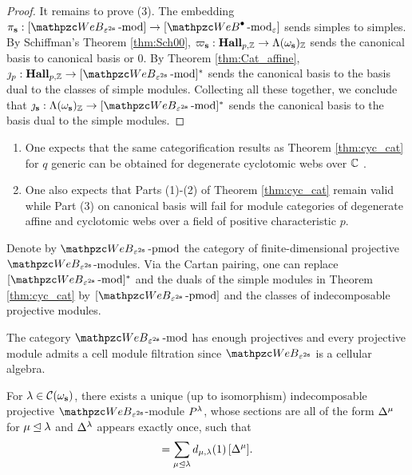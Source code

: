 \begin{proof}
It remains to prove (3). The embedding $\pi_\bfs: [\qW_{\eps^{2\bfs}} \modf] \rightarrow [\qAW \modf_\eps]$ sends simples to simples. By Schiffman's Theorem \ref{thm:Sch00}, $\varpi_{\mathbf{s}}: \bold{Hall}_{p,\mathbb{Z}} \rightarrow \Lambda(\omega_{\mathbf{s}})_{\mathbb{Z}}$ sends the canonical basis to canonical basis or $0$. By Theorem \ref{thm:Cat_affine}, $\jmath_p: \HallZ \rightarrow [\qW_{\eps^{2\bfs}}\modf]^*$ sends the canonical basis to the basis dual to the classes of simple modules. Collecting all these together, we conclude that $\jmath_\bfs: \Lambda (\omega_\bfs)_\Z\rightarrow  [\qW_{\eps^{2\bfs}} \modf]^*$ sends the canonical basis to the basis dual to the simple modules.
\end{proof}

\begin{rem}
\begin{enumerate}
\item 
One expects that the same categorification results as Theorem \ref{thm:cyc_cat} for $q$ generic can be obtained for degenerate cyclotomic webs over $\mathbb{C}$ \cite{SW25web}. 
\item
One also expects that Parts (1)-(2) of Theorem \ref{thm:cyc_cat} remain valid while Part (3) on canonical basis will fail for module categories of degenerate affine and cyclotomic webs over a field of positive characteristic $p$. 
\end{enumerate}
\end{rem}

\begin{rem} \label{rem:Cartan_pairing}
    Denote by $\qW_{\eps^{2\bfs}} \prmod$ the category of finite-dimensional projective $\qW_{\eps^{2\bfs}}$-modules. Via the Cartan pairing, one can replace $[\qW_{\eps^{2\bfs}}\modf]^*$ and the duals of the simple modules in Theorem \ref{thm:cyc_cat}  by $[\qW_{\eps^{2\bfs}}\prmod]$ and the classes of indecomposable projective modules.
\end{rem}

The category $\qW_{\eps^{2\bfs}} \modf$  has enough projectives and every projective module admits a cell module filtration since $\qW_{\eps^{2\bfs}}$ is a cellular algebra. 

\begin{corollary}
\label{cor:PIM}
    For $\lambda \in \mathcal C(\omega_{\mathbf{s}})$, there exists a unique (up to isomorphism) indecomposable projective $\qW_{\eps^{2\bfs}}$-module $P^{\lambda}$, whose sections are all of the form $\Delta^\mu$ for $\mu\unlhd \lambda$ and $\Delta^\lambda$ appears exactly once, such that  
\begin{align}
    [P^{\bfla}] = \sum_{\bfmu \unlhd \bfla} d_{\bfmu,\bfla}(1) \,[\Delta^{\bfmu}].
\end{align}
\end{corollary}

